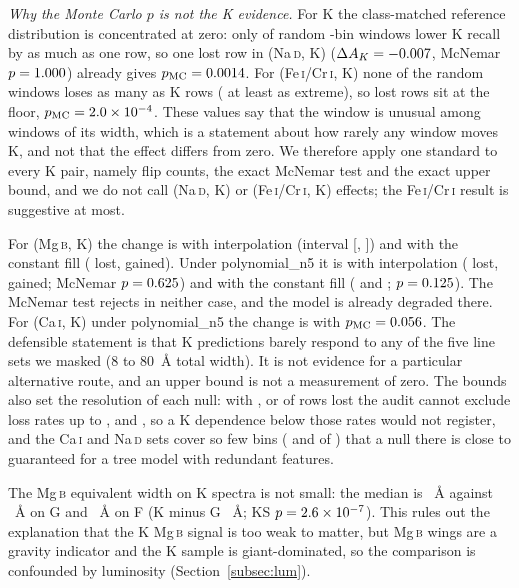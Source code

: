 \documentclass[11pt,a4paper]{article}
\newcommand{\Mgb}{Mg\,\textsc{b}\xspace}
\newcommand{\NaD}{Na\,\textsc{d}\xspace}
\newcommand{\CaI}{Ca\,\textsc{i}\xspace}
\newcommand{\FeCr}{Fe\,\textsc{i}/Cr\,\textsc{i}\xspace}
\newcommand{\dA}{\Delta A}
\begin{document}
\emph{Why the Monte Carlo $p$ is not the K evidence.} For K the class-matched reference distribution is concentrated at zero: only \ablPrimNaKNullB{} of \ablNControls{} random \ablPrimNaKBins-bin windows lower K recall by as much as one row, so one lost row in (\NaD, K) ($\dA_K = \ablPrimNaKDelta$, McNemar $p = 1.000$) already gives $p_{\mathrm{MC}} = 0.0014$. For (\FeCr, K) none of the random windows loses as many as \ablPrimFeKLost{} K rows (\ablPrimFeKNullB{} at least as extreme), so \ablPrimFeKLost{} lost rows sit at the floor, $p_{\mathrm{MC}} = 2.0\times10^{-4}$. These values say that the window is unusual among windows of its width, which is a statement about how rarely any window moves K, and not that the effect differs from zero. We therefore apply one standard to every K pair, namely flip counts, the exact McNemar test and the exact upper bound, and we do not call (\NaD, K) or (\FeCr, K) effects; the \FeCr result is suggestive at most.

For (\Mgb, K) the change is \ablPrimMgKDelta{} with interpolation (interval [\ablPrimMgKCiLo, \ablPrimMgKCiHi]) and \ablConstMgKDelta{} with the constant fill (\ablConstMgKLost{} lost, \ablConstMgKGained{} gained). Under polynomial\_n5 it is \ablPolyMgKDelta{} with interpolation (\ablPolyMgKLost{} lost, \ablPolyMgKGained{} gained; McNemar $p = 0.625$) and \ablPolyConstMgKDelta{} with the constant fill (\ablPolyConstMgKLost{} and \ablPolyConstMgKGained; $p = 0.125$). The McNemar test rejects in neither case, and the model is already degraded there. For (\CaI, K) under polynomial\_n5 the change is \ablPolyCaKDelta{} with $p_{\mathrm{MC}} = 0.056$. The defensible statement is that K predictions barely respond to any of the five line sets we masked (8 to 80~\AA{} total width). It is not evidence for a particular alternative route, and an upper bound is not a measurement of zero. The bounds also set the resolution of each null: with \ablPrimCaKLost, \ablPrimMgKLost{} or \ablPrimFeKLost{} of \nClassK{} rows lost the audit cannot exclude loss rates up to \ablPrimCaKUpper, \ablPrimMgKUpper{} and \ablKMaxUpper, so a K dependence below those rates would not register, and the \CaI and \NaD sets cover so few bins (\ablPrimCaKBins{} and \ablPrimNaKBins{} of \sdNBins) that a null there is close to guaranteed for a tree model with redundant features.

The \Mgb equivalent width on K spectra is not small: the median is \ewMedK~\AA{} against \ewMedG~\AA{} on G and \ewMedF~\AA{} on F (K minus G \ewDiff~\AA; KS $p = 2.6\times10^{-7}$). This rules out the explanation that the K \Mgb signal is too weak to matter, but \Mgb wings are a gravity indicator and the K sample is giant-dominated, so the comparison is confounded by luminosity (Section~\ref{subsec:lum}).
\end{document}
